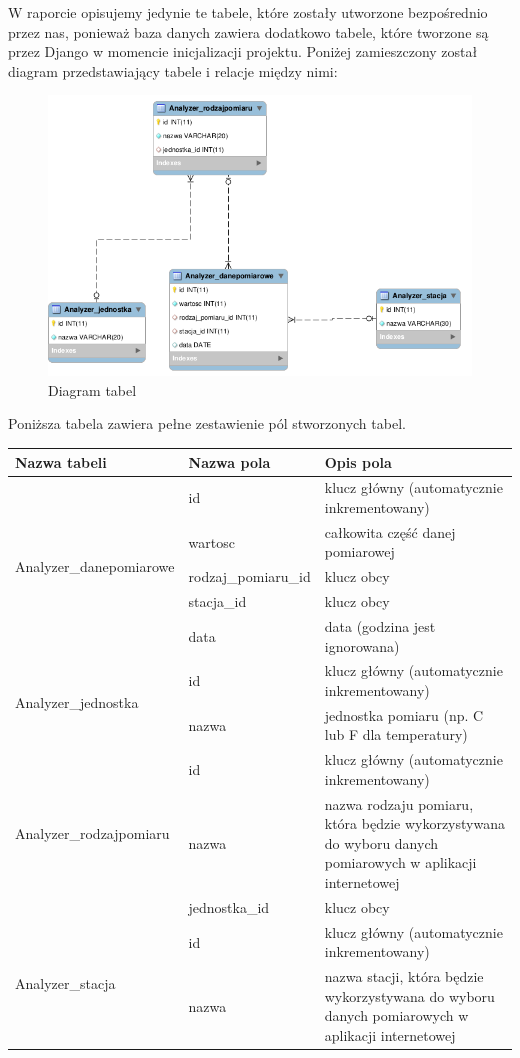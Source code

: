 W raporcie opisujemy jedynie te tabele, które zostały utworzone bezpośrednio przez nas, ponieważ baza danych zawiera dodatkowo tabele, które tworzone są przez Django w momencie inicjalizacji projektu.
Poniżej zamieszczony został diagram przedstawiający tabele i relacje między nimi:
\begin{figure}[H]
\centering
\includegraphics[width=\linewidth]{diagramEER}
\caption{Diagram tabel}
\label{fig:diagramTabel}
\end{figure}

 Poniższa tabela zawiera pełne zestawienie pól stworzonych tabel.
\begin{longtable}{|p{0.25\linewidth}|p{0.25\linewidth}||p{0.5\linewidth}|}
\hline
\textbf{Nazwa tabeli} & \textbf{Nazwa pola} & \textbf{Opis pola} \tabularnewline \hline \hline
\multirow{5}{*}{Analyzer\_danepomiarowe} & id & klucz główny (automatycznie inkrementowany) \tabularnewline\cline{2-3}
 & wartosc & całkowita część danej pomiarowej \tabularnewline\cline{2-3}
 & rodzaj\_pomiaru\_id & klucz obcy \tabularnewline\cline{2-3}
 & stacja\_id & klucz obcy \tabularnewline\cline{2-3}
 & data & data (godzina jest ignorowana) \tabularnewline\hline
\multirow{2}{*}{Analyzer\_jednostka} 
 & id & klucz główny (automatycznie inkrementowany) \tabularnewline\cline{2-3}
 & nazwa & jednostka pomiaru (np. C lub F dla temperatury) \tabularnewline\hline
\multirow{3}{*}{Analyzer\_rodzajpomiaru}
 & id & klucz główny (automatycznie inkrementowany) \tabularnewline\cline{2-3}
 & nazwa & nazwa rodzaju pomiaru, która będzie wykorzystywana do wyboru danych pomiarowych w aplikacji internetowej \tabularnewline\cline{2-3}
 & jednostka\_id & klucz obcy \tabularnewline\hline
\multirow{2}{*}{Analyzer\_stacja}
 & id & klucz główny (automatycznie inkrementowany) \tabularnewline\cline{2-3}
 & nazwa & nazwa stacji, która będzie wykorzystywana do wyboru danych pomiarowych w aplikacji internetowej \tabularnewline\hline
\end{longtable}

